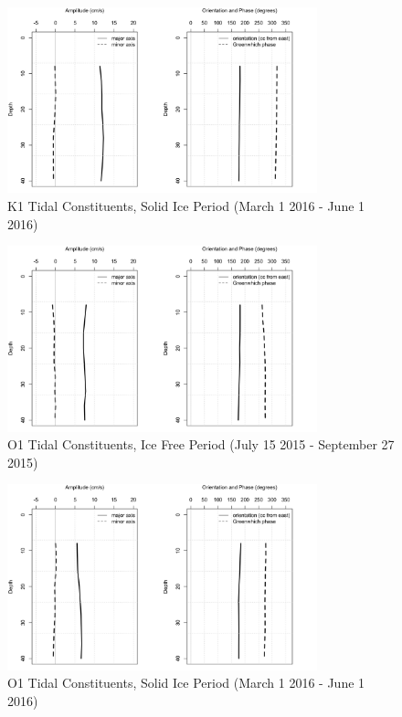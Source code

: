 \documentclass[12pt]{dforeport}
\begin{document}
\begin{figure}  
\centering
\includegraphics[width = 0.8\textwidth]{./figures/58_K1TC_si_2015.png}
\caption[K1 Tidal Constituents, Solid Ice, 2015]{K1 Tidal Constituents, Solid Ice Period (March 1 2016 - June 1 2016)}
\label{f:k1_si_2015}
\end{figure}


\begin{figure}  
\centering
\includegraphics[width = 0.8\textwidth]{./figures/59_O1TC_if_2015.png}
\caption[O1 Tidal Constituents, Ice free, 2015]{O1 Tidal Constituents, Ice Free Period (July 15 2015 - September 27 2015)}
\label{f:o1_if_2015}
\end{figure}

\begin{figure}  
\centering
\includegraphics[width = 0.8\textwidth]{./figures/60_O1TC_si_2015.png}
\caption[O1 Tidal Constituents, Solid Ice, 2015]{O1 Tidal Constituents, Solid Ice Period (March 1 2016 - June 1 2016)}
\label{f:o1_si_2015}
\end{figure}
\end{document}
